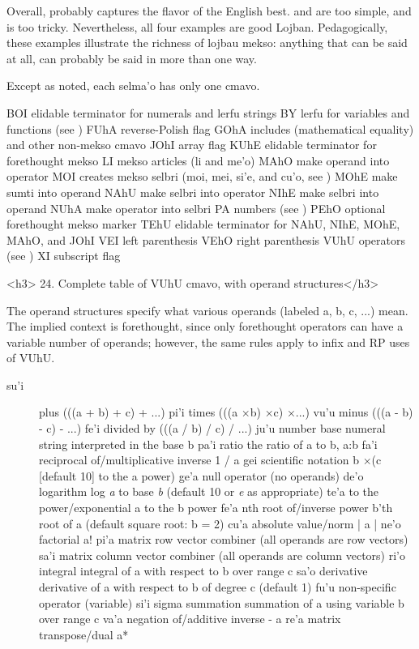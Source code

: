 Overall,  probably captures
    the flavor of the English best.  and  are too simple,
    and  is too tricky.
    Nevertheless, all four examples are good Lojban. Pedagogically,
    these examples illustrate the richness of lojbau mekso:
    anything that can be said at all, can probably be said in more
    than one way.



Except as noted, each selma'o has only one cmavo.

   BOI elidable terminator for numerals
        and lerfu strings
    BY  lerfu for variables and functions
        (see )
    FUhA    reverse-Polish flag
    GOhA    includes  (mathematical equality)
        and other non-mekso cmavo
    JOhI    array flag
    KUhE    elidable terminator for forethought mekso
    LI  mekso articles (li and me'o)
    MAhO    make operand into operator
    MOI creates mekso selbri
        (moi, mei, si'e, and cu'o, see )
    MOhE    make sumti into operand
    NAhU    make selbri into operator
    NIhE    make selbri into operand
    NUhA    make operator into selbri
    PA  numbers (see )
    PEhO    optional forethought mekso marker
    TEhU    elidable terminator for
        NAhU, NIhE, MOhE, MAhO, and JOhI
    VEI left parenthesis
    VEhO    right parenthesis
    VUhU    operators (see )
    XI  subscript flag

<h3>
24. Complete table of VUhU cmavo, with operand
    structures</h3>

The operand structures specify what various operands
    (labeled a, b, c, ...) mean. The implied context is
    forethought, since only forethought operators can have a
    variable number of operands; however, the same rules apply to
    infix and RP uses of VUhU.
\begin{description}
\item[su'i] plus (((a + b) + c) + ...) pi'i times (((a $\times$b) $\times$c) $\times$...) vu'u minus (((a - b) - c) - ...) fe'i divided by (((a / b) / c) / ...) ju'u number base numeral string  interpreted in the base b pa'i ratio the ratio of a to b, a:b fa'i reciprocal of/multiplicative inverse 1 / a gei scientific notation b $\times$(c [default 10] to the a power) ge'a null operator (no operands) de'o logarithm log \textit{a} to base \textit{b} (default 10 or \textit{e} as appropriate) te'a to the power/exponential a to the b power fe'a nth root of/inverse power b'th root of a (default square root: b = 2) cu'a absolute value/norm | a | ne'o factorial a! pi'a matrix row vector combiner (all operands are row vectors) sa'i matrix column vector combiner (all operands are column vectors) ri'o integral integral of a with respect to b over range c sa'o derivative derivative of a with respect to b of degree c (default 1) fu'u non-specific operator (variable) si'i sigma summation summation of a using variable b over range c va'a negation of/additive inverse - a re'a matrix transpose/dual a*

\end{description}

